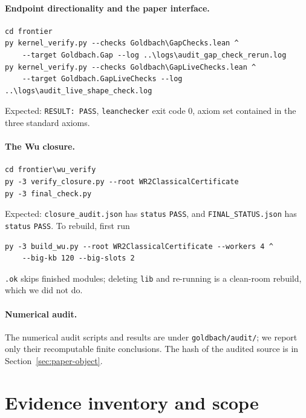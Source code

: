 \documentclass[11pt,a4paper]{article}
\theoremstyle{plain}
\theoremstyle{definition}
\begin{document}
\paragraph{Endpoint directionality and the paper interface.}
\begin{verbatim}
cd frontier
py kernel_verify.py --checks Goldbach\GapChecks.lean ^
    --target Goldbach.Gap --log ..\logs\audit_gap_check_rerun.log
py kernel_verify.py --checks Goldbach\GapLiveChecks.lean ^
    --target Goldbach.GapLiveChecks --log ..\logs\audit_live_shape_check.log
\end{verbatim}
Expected: \texttt{RESULT: PASS}, \texttt{leanchecker} exit code 0, axiom set contained in the three standard axioms.

\paragraph{The Wu closure.}
\begin{verbatim}
cd frontier\wu_verify
py -3 verify_closure.py --root WR2ClassicalCertificate
py -3 final_check.py
\end{verbatim}
Expected: \texttt{closure\_audit.json} has \texttt{status} \texttt{PASS}, and \texttt{FINAL\_STATUS.json} has \texttt{status} \texttt{PASS}. To rebuild, first run
\begin{verbatim}
py -3 build_wu.py --root WR2ClassicalCertificate --workers 4 ^
    --big-kb 120 --big-slots 2
\end{verbatim}
\texttt{.ok} skips finished modules; deleting \texttt{lib} and re-running is a clean-room rebuild, which we did not do.

\paragraph{Numerical audit.}
The numerical audit scripts and results are under \texttt{goldbach/audit/}; we report only their recomputable finite conclusions. The hash of the audited source is in Section~\ref{sec:paper-object}.

\section{Evidence inventory and scope}
\label{app:evidence}
\end{document}
